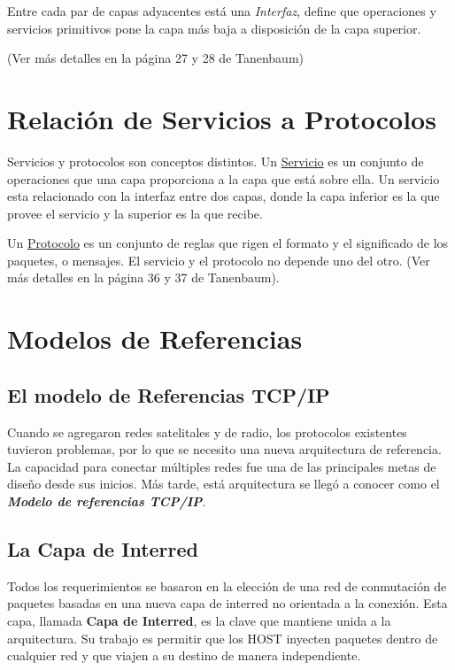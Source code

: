 \documentclass[12pt]{report}
\begin{document}
Entre cada par de capas adyacentes est\'a una \textit {Interfaz}, define que operaciones y servicios primitivos pone la capa m\'as baja a disposici\'on de la capa superior.

(Ver  m\'as detalles en la página 27 y 28 de Tanenbaum)

\section*{Relaci\'on de Servicios a Protocolos}

Servicios y protocolos son conceptos distintos. Un \underline {Servicio} es un conjunto de operaciones que una capa proporciona a la capa que est\'a sobre ella. Un servicio esta relacionado con la interfaz entre dos capas, donde la capa inferior es la que provee el servicio y la superior es la que recibe. 

Un \underline {Protocolo} es un conjunto de reglas que rigen el formato y el significado de los paquetes, o mensajes. El servicio y el protocolo no depende uno del otro.
(Ver  m\'as detalles en la p\'agina 36 y 37 de Tanenbaum).

\section*{Modelos de Referencias}
\subsection*{El modelo de Referencias TCP/IP}

Cuando se agregaron redes satelitales y de radio, los protocolos existentes tuvieron problemas, por lo que se necesito una nueva arquitectura de referencia. La capacidad para conectar m\'ultiples redes fue una de las principales metas de dise\~no desde sus inicios. M\'as tarde, est\'a arquitectura se lleg\'o a conocer como el \textit {\bf Modelo de referencias TCP/IP}.

\subsection*{La Capa de Interred}

Todos los requerimientos se basaron en la elecci\'on de una red de conmutaci\'on de paquetes basadas en una nueva capa de interred no orientada a la conexi\'on. Esta capa, llamada {\bf Capa de Interred}, es la clave que mantiene unida a la arquitectura. Su trabajo es permitir que los HOST inyecten paquetes dentro de cualquier red y que viajen a su destino de manera independiente.
 
\end{document}
